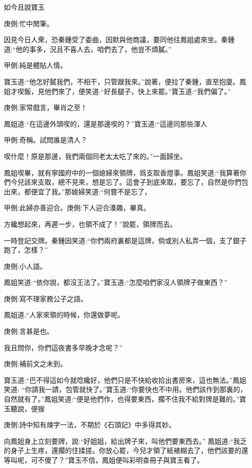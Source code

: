 \begin{parag}
    如今且說寶玉\begin{note}庚側:忙中閒筆。\end{note}因見今日人衆，恐秦鍾受了委曲，因默與他商議，要同他往鳳姐處來坐。秦鍾道:“他的事多，況且不喜人去，咱們去了，他豈不煩膩。”\begin{note}甲側:純是體貼人情。\end{note}寶玉道:“他怎好膩我們，不相干，只管跟我來。”說著，便拉了秦鍾，直至抱廈。鳳姐才喫飯，見他們來了，便笑道:“好長腿子，快上來罷。”寶玉道:“我們偏了。”\begin{note}庚側:家常戲言，畢肖之至！\end{note}鳳姐道:“在這邊外頭喫的，還是那邊喫的？”寶玉道:“這邊同那些渾人\begin{note}甲側:奇稱。試問誰是清人？\end{note}喫什麼！原是那邊，我們兩個同老太太吃了來的。”一面歸坐。
\end{parag}


\begin{parag}
    鳳姐喫畢，就有寧國府中的一個媳婦來領牌，爲支取香燈事。鳳姐笑道:“我算著你們今兒該來支取，總不見來，想是忘了。這會子到底來取，要忘了，自然是你們包出來，都便宜了我。”那媳婦笑道:“何嘗不是忘了，\begin{note}甲側:此婦亦善迎合。庚側:下人迎合湊趣，畢真。\end{note}方纔想起來，再遲一步，也領不成了！”說罷，領牌而去。
\end{parag}


\begin{parag}
    一時登記交牌。秦鍾因笑道:“你們兩府裏都是這牌，倘或別人私弄一個，支了銀子跑了，怎樣？”\begin{note}庚側:小人語。\end{note}鳳姐笑道:“依你說，都沒王法了。”寶玉道:“怎麼咱們家沒人領牌子做東西？”\begin{note}庚側:寫不理家務公子之語。\end{note}鳳姐道:“人家來領的時候，你還做夢呢。\begin{note}庚側:言甚是也。\end{note}我且問你，你們這夜書多早晚才念呢？”\begin{note}庚側:補前文之未到。\end{note}寶玉道:“巴不得這如今就唸纔好，他們只是不快給收拾出書房來，這也無法。”鳳姐笑道: “你請我一請，包管就快了。”寶玉道:“你要快也不中用。他們該作到那裏的，自然就有了。”鳳姐笑道:“便是他們作，也得要東西，擱不住我不給對牌是難的。”寶玉聽說，便猴\begin{note}庚側:詩中知有煉字一法，不期於《石頭記》中多得其妙。\end{note}向鳳姐身上立刻要牌，說:“好姐姐，給出牌子來，叫他們要東西去。” 鳳姐道:“我乏的身子上生疼，還擱的住揉搓。你放心罷，今兒才領了紙裱糊去了，他們該要的還等叫呢，可不傻了？”寶玉不信，鳳姐便叫彩明查冊子與寶玉看了。
\end{parag}


